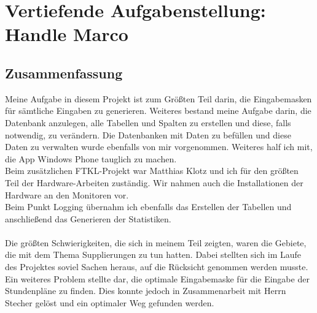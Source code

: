 \chapter[Handle]{Vertiefende Aufgabenstellung: \\Handle Marco}

\section{Zusammenfassung}
Meine Aufgabe in diesem Projekt ist zum Größten Teil darin, die Eingabemasken für sämtliche Eingaben zu generieren. Weiteres bestand meine Aufgabe darin, die Datenbank anzulegen, alle Tabellen und Spalten zu erstellen und diese, falls notwendig, zu verändern. Die Datenbanken mit Daten zu befüllen und diese Daten zu verwalten wurde ebenfalls von mir vorgenommen. Weiteres half ich mit, die App Windows Phone tauglich zu machen.\\
Beim zusätzlichen FTKL-Projekt war Matthias Klotz und ich für den größten Teil der Hardware-Arbeiten zuständig. Wir nahmen auch die Installationen der Hardware an den Monitoren vor.\\
Beim Punkt Logging übernahm ich ebenfalls das Erstellen der Tabellen und anschließend das Generieren der Statistiken.\\
\\
Die größten Schwierigkeiten, die sich in meinem Teil zeigten, waren die Gebiete, die mit dem Thema Supplierungen zu tun hatten. Dabei stellten sich im Laufe des Projektes soviel Sachen heraus, auf die Rücksicht genommen werden musste.\\
Ein weiteres Problem stellte dar, die optimale Eingabemaske für die Eingabe der Stundenpläne zu finden. Dies konnte jedoch in Zusammenarbeit mit Herrn Stecher gelöst und ein optimaler Weg gefunden werden. 
